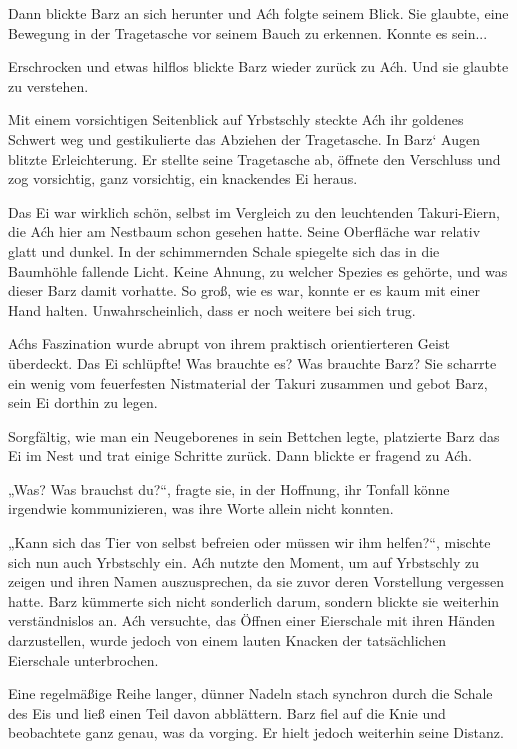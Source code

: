Dann blickte Barz an sich herunter und Aćh folgte seinem Blick. Sie glaubte, eine Bewegung in der Tragetasche vor seinem Bauch zu erkennen. Konnte es sein...

Erschrocken und etwas hilflos blickte Barz wieder zurück zu Aćh. Und sie glaubte zu verstehen.

Mit einem vorsichtigen Seitenblick auf Yrbstschly steckte Aćh ihr goldenes Schwert weg und gestikulierte das Abziehen der Tragetasche. In Barz‘ Augen blitzte Erleichterung. Er stellte seine Tragetasche ab, öffnete den Verschluss und zog vorsichtig, ganz vorsichtig, ein knackendes Ei heraus.

Das Ei war wirklich schön, selbst im Vergleich zu den leuchtenden Takuri-Eiern, die Aćh hier am Nestbaum schon gesehen hatte. Seine Oberfläche war relativ glatt und dunkel. In der schimmernden Schale spiegelte sich das in die Baumhöhle fallende Licht. Keine Ahnung, zu welcher Spezies es gehörte, und was dieser Barz damit vorhatte. So groß, wie es war, konnte er es kaum mit einer Hand halten. Unwahrscheinlich, dass er noch weitere bei sich trug.

Aćhs Faszination wurde abrupt von ihrem praktisch orientierteren Geist überdeckt. Das Ei schlüpfte! Was brauchte es? Was brauchte Barz? Sie scharrte ein wenig vom feuerfesten Nistmaterial der Takuri zusammen und gebot Barz, sein Ei dorthin zu legen.

Sorgfältig, wie man ein Neugeborenes in sein Bettchen legte, platzierte Barz das Ei im Nest und trat einige Schritte zurück. Dann blickte er fragend zu Aćh.

„Was? Was brauchst du?“, fragte sie, in der Hoffnung, ihr Tonfall könne irgendwie kommunizieren, was ihre Worte allein nicht konnten.

„Kann sich das Tier von selbst befreien oder müssen wir ihm helfen?“, mischte sich nun auch Yrbstschly ein. Aćh nutzte den Moment, um auf Yrbstschly zu zeigen und ihren Namen auszusprechen, da sie zuvor deren Vorstellung vergessen hatte. Barz kümmerte sich nicht sonderlich darum, sondern blickte sie weiterhin verständnislos an. Aćh versuchte, das Öffnen einer Eierschale mit ihren Händen darzustellen, wurde jedoch von einem lauten Knacken der tatsächlichen Eierschale unterbrochen.

Eine regelmäßige Reihe langer, dünner Nadeln stach synchron durch die Schale des Eis und ließ einen Teil davon abblättern. Barz fiel auf die Knie und beobachtete ganz genau, was da vorging. Er hielt jedoch weiterhin seine Distanz.

